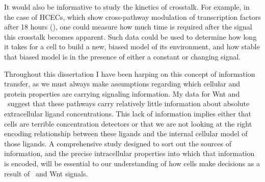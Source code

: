 It would also be informative to study the kinetics of crosstalk.
For example, in the case of HCECs, which show cross-pathway
modulation of transcription factors after 18 hours
(),
one could measure how much time is required after the
signal this crosstalk becomes apparent. Such data could be used
to determine how
long it takes for a cell to build a new, biased model of
its environment, and how stable that biased model is in the presence
of either a constant or changing signal.


Throughout this dissertation I have been harping on this
concept of information transfer, as we must always make
assumptions regarding which cellular and protein properties
are carrying signaling information. My data for Wnt and
\tgfbsf\ suggest that these pathways carry relatively little information
about absolute extracellular ligand concentrations. This lack
of information implies either that cells are terrible concentration
detectors or that we are not looking at the right encoding
relationship between these ligands and the internal cellular model of those
ligands. A comprehensive study designed to sort out the sources
of information, and the precise intracellular properties into which
that information is encoded, will be essential to our understanding
of how cells make decisions as a result of \tgfbsf\ and Wnt signals.






